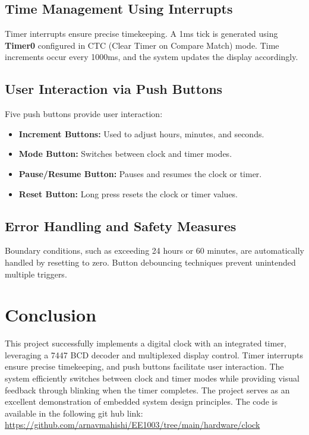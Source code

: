 \documentclass[a4paper,12pt]{article}
\begin{document}
\subsection{Time Management Using Interrupts}
Timer interrupts ensure precise timekeeping. A 1ms tick is generated using \textbf{Timer0} configured in CTC (Clear Timer on Compare Match) mode. Time increments occur every 1000ms, and the system updates the display accordingly.

\subsection{User Interaction via Push Buttons}
Five push buttons provide user interaction:
\begin{itemize}
    \item \textbf{Increment Buttons:} Used to adjust hours, minutes, and seconds.
    \item \textbf{Mode Button:} Switches between clock and timer modes.
    \item \textbf{Pause/Resume Button:} Pauses and resumes the clock or timer.
    \item \textbf{Reset Button:} Long press resets the clock or timer values.
\end{itemize}

\subsection{Error Handling and Safety Measures}
Boundary conditions, such as exceeding 24 hours or 60 minutes, are automatically handled by resetting to zero. Button debouncing techniques prevent unintended multiple triggers.

\section{Conclusion}
This project successfully implements a digital clock with an integrated timer, leveraging a 7447 BCD decoder and multiplexed display control. Timer interrupts ensure precise timekeeping, and push buttons facilitate user interaction. The system efficiently switches between clock and timer modes while providing visual feedback through blinking when the timer completes. The project serves as an excellent demonstration of embedded system design principles.
The code is available in the following git hub link:
\url{https://github.com/arnavmahishi/EE1003/tree/main/hardware/clock}
\end{document}
